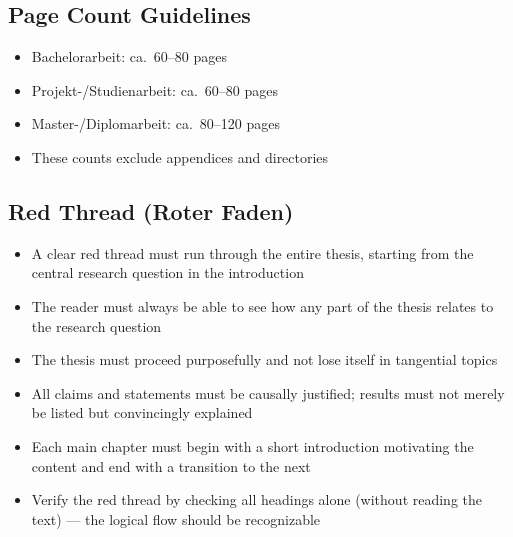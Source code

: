 \subsection{Page Count Guidelines}
\begin{itemize}
    \item Bachelorarbeit: ca.\ 60--80 pages
    \item Projekt-/Studienarbeit: ca.\ 60--80 pages
    \item Master-/Diplomarbeit: ca.\ 80--120 pages
    \item These counts exclude appendices and directories
\end{itemize}

\subsection{Red Thread (Roter Faden)}
\begin{itemize}
    \item A clear red thread must run through the entire thesis, starting from the central research question in the introduction
    \item The reader must always be able to see how any part of the thesis relates to the research question
    \item The thesis must proceed purposefully and not lose itself in tangential topics
    \item All claims and statements must be causally justified; results must not merely be listed but convincingly explained
    \item Each main chapter must begin with a short introduction motivating the content and end with a transition to the next
    \item Verify the red thread by checking all headings alone (without reading the text) --- the logical flow should be recognizable
\end{itemize}

